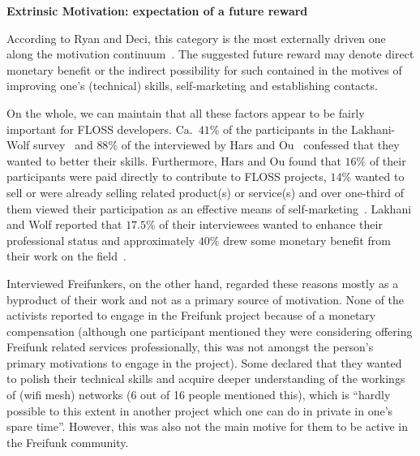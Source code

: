 \documentclass{scrartcl}
\begin{document}

\textbf{Extrinsic Motivation: expectation of a future reward}

According to Ryan and Deci, this category is the most externally driven one along the motivation continuum~\cite{RyDe2000}.
The suggested future reward may denote direct monetary benefit or the indirect possibility for such contained in the motives of improving one's (technical) skills, self-marketing and establishing contacts.

On the whole, we can maintain that all these factors appear to be fairly important for FLOSS developers.
Ca.\ $41\%$ of the participants in the Lakhani-Wolf survey~\cite{LakWo2005} and $88\%$ of the interviewed by Hars and Ou~\cite{HarOu2002} confessed that they wanted to better their skills.
Furthermore, Hars and Ou found that $16\%$ of their participants were paid directly to contribute to FLOSS projects, $14\%$ wanted to sell or were already selling related product(s) or service(s) and over one-third of them viewed their participation as an effective means of self-marketing~\cite{HarOu2002}.
Lakhani and Wolf reported that $17.5\%$ of their interviewees wanted to enhance their professional status and approximately $40\%$ drew some monetary benefit from their work on the field~\cite{LakWo2005}.

Interviewed Freifunkers, on the other hand, regarded these reasons mostly as a byproduct of their work and not as a primary source of motivation.
None of the activists reported to engage in the Freifunk project because of a monetary compensation
(although one participant mentioned they were considering offering Freifunk related services professionally, this was not amongst the person's primary motivations to engage in the project).
Some declared that they wanted to polish their technical skills and acquire deeper understanding of the workings of (wifi mesh) networks (6 out of 16 people mentioned this), which is ``hardly possible to this extent in another project which one can do in private in one's spare time''.
However, this was also not the main motive for them to be active in the Freifunk community.
\end{document}
